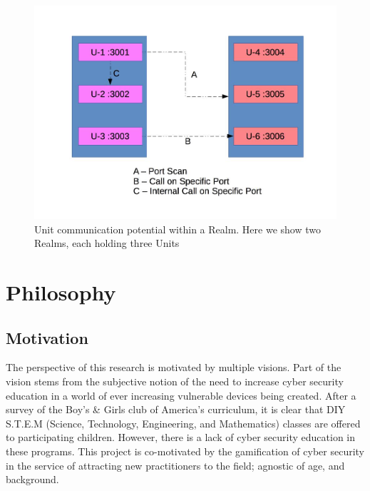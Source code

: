 \documentclass[10pt, titlepage, twocolumn]{article}
\newcommand{\ii}{\indent\indent}
\begin{document}





\begin{figure}[ht]
\centering
	\includegraphics[width=\textwidth]{Architecture}
	\caption{Unit communication potential within a Realm. Here we show two Realms, each holding three Units}
	\label{Architecture}
\end{figure}


\section{Philosophy}

\subsection{Motivation}
\ii
The perspective of this research is motivated by multiple visions. Part of the vision stems from the subjective notion of the need to increase cyber security education in a world of ever increasing vulnerable devices being created. After a survey of the Boy's \& Girls club of America's curriculum, it is clear that DIY S.T.E.M (Science, Technology, Engineering, and Mathematics) classes are offered to participating children. However, there is a lack of cyber security education in these programs. This project is co-motivated by the gamification of cyber security in the service of attracting new practitioners to the field; agnostic of age, and background.
\end{document}
